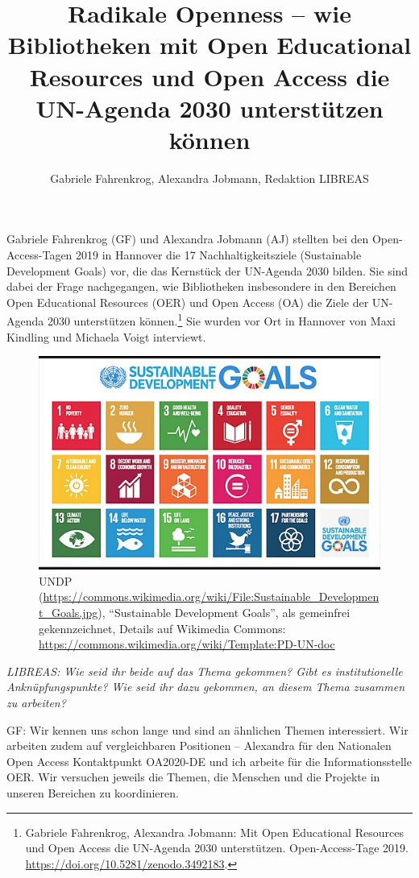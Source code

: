 \documentclass[a4paper,
fontsize=11pt,
oneside,
numbers=noperiodatend,
parskip=half-,
bibliography=totoc,
final
]{scrartcl}
\title{\LARGE{Radikale Openness -- wie Bibliotheken mit Open Educational Resources und Open Access die UN-Agenda 2030 unterstützen können}} %
\author{Gabriele Fahrenkrog, Alexandra Jobmann, Redaktion LIBREAS} %
\date{}
\begin{document}
\maketitle
\thispagestyle{fancyplain} 


Gabriele Fahrenkrog (GF) und Alexandra Jobmann (AJ) stellten bei den
Open-Access-Tagen 2019 in Hannover die 17 Nachhaltigkeitsziele
(Sustainable Development Goals) vor, die das Kernstück der UN-Agenda
2030 bilden. Sie sind dabei der Frage nachgegangen, wie Bibliotheken
insbesondere in den Bereichen Open Educational Resources (OER) und Open
Access (OA) die Ziele der UN-Agenda 2030 unterstützen können.\footnote{Gabriele
  Fahrenkrog, Alexandra Jobmann: Mit Open Educational Resources und Open
  Access die UN-Agenda 2030 unterstützen. Open-Access-Tage 2019.
  \url{https://doi.org/10.5281/zenodo.3492183}.} Sie wurden vor Ort in
Hannover von Maxi Kindling und Michaela Voigt interviewt.

\begin{figure}
\centering
\includegraphics{SDG.jpg}
\caption{UNDP
(\url{https://commons.wikimedia.org/wiki/File:Sustainable_Development_Goals.jpg}),
\enquote{Sustainable Development Goals}, als gemeinfrei gekennzeichnet,
Details auf Wikimedia Commons:
\url{https://commons.wikimedia.org/wiki/Template:PD-UN-doc}}
\end{figure}

\emph{LIBREAS: Wie seid ihr beide auf das Thema gekommen? Gibt es
institutionelle Anknüpfungspunkte? Wie seid ihr dazu gekommen, an diesem
Thema zusammen zu arbeiten?}

GF: Wir kennen uns schon lange und sind an ähnlichen Themen
interessiert. Wir arbeiten zudem auf vergleichbaren Positionen --
Alexandra für den Nationalen Open Access Kontaktpunkt OA2020-DE und ich
arbeite für die Informationsstelle OER. Wir versuchen jeweils die
Themen, die Menschen und die Projekte in unseren Bereichen zu
koordinieren.
\end{document}
